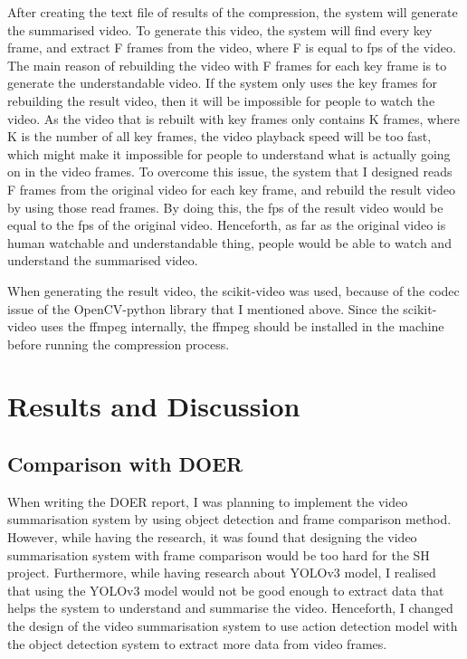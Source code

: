 \documentclass{article}
\begin{document}
After creating the text file of results of the compression, the system will generate the summarised video. To generate this video, the system will find every key frame, and extract F frames from the video, where F is equal to fps of the video. The main reason of rebuilding the video with F frames for each key frame is to generate the understandable video. If the system only uses the key frames for rebuilding the result video, then it will be impossible for people to watch the video. As the video that is rebuilt with key frames only contains K frames, where K is the number of all key frames, the video playback speed will be too fast, which might make it impossible for people to understand what is actually going on in the video frames. To overcome this issue, the system that I designed reads F frames from the original video for each key frame, and rebuild the result video by using those read frames. By doing this, the fps of the result video would be equal to the fps of the original video. Henceforth, as far as the original video is human watchable and understandable thing, people would be able to watch and understand the summarised video.

When generating the result video, the scikit-video was used, because of the codec issue of the OpenCV-python library that I mentioned above. Since the scikit-video uses the ffmpeg internally, the ffmpeg should be installed in the machine before running the compression process.

\section{Results and Discussion}

\subsection{Comparison with DOER}

When writing the DOER report, I was planning to implement the video summarisation system by using object detection and frame comparison method. However, while having the research, it was found that designing the video summarisation system with frame comparison would be too hard for the SH project. Furthermore, while having research about YOLOv3 model, I realised that using the YOLOv3 model would not be good enough to extract data that helps the system to understand and summarise the video. Henceforth, I changed the design of the video summarisation system to use action detection model with the object detection system to extract more data from video frames.
\end{document}
